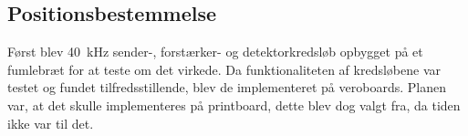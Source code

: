 \subsection{Positionsbestemmelse}

Først blev \SI{40}{kHz} sender-, forstærker- og detektorkredsløb opbygget på et fumlebræt for at teste om det virkede. Da funktionaliteten af kredsløbene var testet og fundet tilfredsstillende, blev de implementeret på veroboards. Planen var, at det skulle implementeres på printboard, dette blev dog valgt fra, da tiden ikke var til det.


